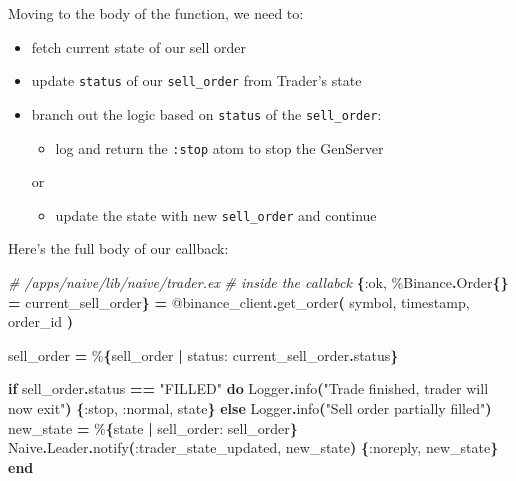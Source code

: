 \documentclass[
  oneside]{book}
\newenvironment{Shaded}{\begin{snugshade}}{\end{snugshade}}
\newcommand{\CommentTok}[1]{\textcolor[rgb]{0.56,0.35,0.01}{\textit{#1}}}
\newcommand{\ConstantTok}[1]{\textcolor[rgb]{0.56,0.35,0.01}{#1}}
\newcommand{\ControlFlowTok}[1]{\textcolor[rgb]{0.13,0.29,0.53}{\textbf{#1}}}
\newcommand{\FunctionTok}[1]{\textcolor[rgb]{0.13,0.29,0.53}{\textbf{#1}}}
\newcommand{\KeywordTok}[1]{\textcolor[rgb]{0.13,0.29,0.53}{\textbf{#1}}}
\newcommand{\NormalTok}[1]{#1}
\newcommand{\OperatorTok}[1]{\textcolor[rgb]{0.81,0.36,0.00}{\textbf{#1}}}
\newcommand{\OtherTok}[1]{\textcolor[rgb]{0.56,0.35,0.01}{#1}}
\newcommand{\StringTok}[1]{\textcolor[rgb]{0.31,0.60,0.02}{#1}}
\newcommand{\VariableTok}[1]{\textcolor[rgb]{0.00,0.00,0.00}{#1}}
\providecommand{\tightlist}{%
  \setlength{\itemsep}{0pt}\setlength{\parskip}{0pt}}
\begin{document}
Moving to the body of the function, we need to:

\begin{itemize}
\item
  fetch current state of our sell order
\item
  update \texttt{status} of our \texttt{sell\_order} from Trader's state
\item
  branch out the logic based on \texttt{status} of the \texttt{sell\_order}:

  \begin{itemize}
  \tightlist
  \item
    log and return the \texttt{:stop} atom to stop the GenServer
  \end{itemize}

  or

  \begin{itemize}
  \tightlist
  \item
    update the state with new \texttt{sell\_order} and continue
  \end{itemize}
\end{itemize}

Here's the full body of our callback:

\begin{Shaded}
\begin{Highlighting}[]
    \CommentTok{\# /apps/naive/lib/naive/trader.ex}
    \CommentTok{\# inside the callabck}
    \FunctionTok{\{}\VariableTok{:ok}\NormalTok{, \%}\ConstantTok{Binance}\OperatorTok{.}\ConstantTok{Order}\FunctionTok{\{\}} \OperatorTok{=}\NormalTok{ current\_sell\_order}\FunctionTok{\}} \OperatorTok{=}
      \OtherTok{@binance\_client}\OperatorTok{.}\NormalTok{get\_order}\FunctionTok{(}
\NormalTok{        symbol,}
\NormalTok{        timestamp,}
\NormalTok{        order\_id}
      \FunctionTok{)}

\NormalTok{    sell\_order }\OperatorTok{=}\NormalTok{ \%}\FunctionTok{\{}\NormalTok{sell\_order }\OperatorTok{|} \VariableTok{status:}\NormalTok{ current\_sell\_order}\OperatorTok{.}\NormalTok{status}\FunctionTok{\}}

    \ControlFlowTok{if}\NormalTok{ sell\_order}\OperatorTok{.}\NormalTok{status }\OperatorTok{==} \StringTok{"FILLED"} \KeywordTok{do}
      \ConstantTok{Logger}\OperatorTok{.}\NormalTok{info}\FunctionTok{(}\StringTok{"Trade finished, trader will now exit"}\FunctionTok{)}
      \FunctionTok{\{}\VariableTok{:stop}\NormalTok{, }\VariableTok{:normal}\NormalTok{, state}\FunctionTok{\}}
    \ControlFlowTok{else}
      \ConstantTok{Logger}\OperatorTok{.}\NormalTok{info}\FunctionTok{(}\StringTok{"Sell order partially filled"}\FunctionTok{)}
\NormalTok{      new\_state }\OperatorTok{=}\NormalTok{ \%}\FunctionTok{\{}\NormalTok{state }\OperatorTok{|} \VariableTok{sell\_order:}\NormalTok{ sell\_order}\FunctionTok{\}}
      \ConstantTok{Naive}\OperatorTok{.}\ConstantTok{Leader}\OperatorTok{.}\NormalTok{notify}\FunctionTok{(}\VariableTok{:trader\_state\_updated}\NormalTok{, new\_state}\FunctionTok{)}
      \FunctionTok{\{}\VariableTok{:noreply}\NormalTok{, new\_state}\FunctionTok{\}}
    \KeywordTok{end}
\end{Highlighting}
\end{Shaded}
\end{document}
